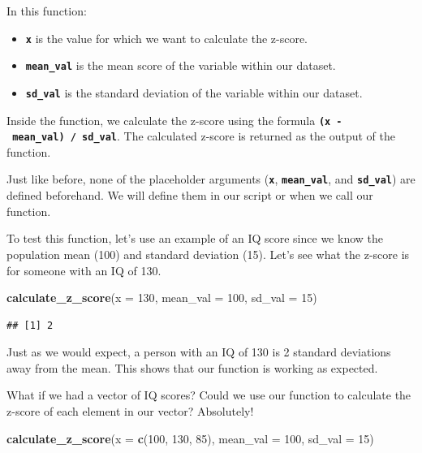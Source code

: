 \documentclass[
]{book}
\newenvironment{Shaded}{\begin{snugshade}}{\end{snugshade}}
\newcommand{\AttributeTok}[1]{\textcolor[rgb]{0.13,0.29,0.53}{#1}}
\newcommand{\DecValTok}[1]{\textcolor[rgb]{0.00,0.00,0.81}{#1}}
\newcommand{\FunctionTok}[1]{\textcolor[rgb]{0.13,0.29,0.53}{\textbf{#1}}}
\newcommand{\NormalTok}[1]{#1}
\begin{document}
In this function:

\begin{itemize}
\item
  \textbf{\texttt{x}} is the value for which we want to calculate the z-score.
\item
  \textbf{\texttt{mean\_val}} is the mean score of the variable within our dataset.
\item
  \textbf{\texttt{sd\_val}} is the standard deviation of the variable within our dataset.
\end{itemize}

Inside the function, we calculate the z-score using the formula \textbf{\texttt{(x\ -\ mean\_val)\ /\ sd\_val}}. The calculated z-score is returned as the output of the function.

Just like before, none of the placeholder arguments (\textbf{\texttt{x}}, \textbf{\texttt{mean\_val}}, and \textbf{\texttt{sd\_val}}) are defined beforehand. We will define them in our script or when we call our function.

To test this function, let's use an example of an IQ score since we know the population mean (100) and standard deviation (15). Let's see what the z-score is for someone with an IQ of 130.

\begin{Shaded}
\begin{Highlighting}[]
\FunctionTok{calculate\_z\_score}\NormalTok{(}\AttributeTok{x =} \DecValTok{130}\NormalTok{, }\AttributeTok{mean\_val =} \DecValTok{100}\NormalTok{, }\AttributeTok{sd\_val =} \DecValTok{15}\NormalTok{)}
\end{Highlighting}
\end{Shaded}

\begin{verbatim}
## [1] 2
\end{verbatim}

Just as we would expect, a person with an IQ of 130 is 2 standard deviations away from the mean. This shows that our function is working as expected.

What if we had a vector of IQ scores? Could we use our function to calculate the z-score of each element in our vector? Absolutely!

\begin{Shaded}
\begin{Highlighting}[]
\FunctionTok{calculate\_z\_score}\NormalTok{(}\AttributeTok{x =} \FunctionTok{c}\NormalTok{(}\DecValTok{100}\NormalTok{, }\DecValTok{130}\NormalTok{, }\DecValTok{85}\NormalTok{), }\AttributeTok{mean\_val =} \DecValTok{100}\NormalTok{, }\AttributeTok{sd\_val =} \DecValTok{15}\NormalTok{)}
\end{Highlighting}
\end{Shaded}
\end{document}
